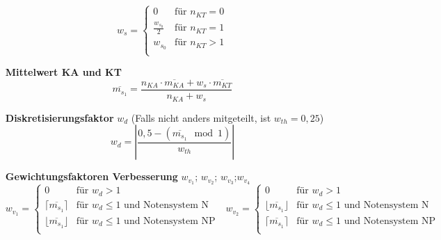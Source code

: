 \documentclass{article}
\begin{document}
\begin{enumerate}[label=\textbf{\textbullet}, align=left, leftmargin=*]
	\[
	w_s =
	\begin{cases}
		0 & \text{für }  n_{KT} = 0 \\
		\frac{w_{s_0}}{2} & \text{für }    n_{KT} = 1 \\
		w_{s_0} & \text{für }    n_{KT} > 1 \\
	\end{cases}
	\]	
	\item[\textbf{Mittelwert KA und KT}] 
	\[
	\overline{m_{s_1}} = \frac{ n_{KA} \cdot \overline{m_{KA}} + w_s \cdot \overline{m_{KT}} }{n_{KA} + w_s}
	\]
	\item[\textbf{Diskretisierungsfaktor}] $w_{d}$ (Falls nicht anders mitgeteilt, ist $w_{th}=0{,}25$) \cite{wikimodulo,wikibetrag}
	\[
	w_{d} = \left| \frac{0{,}5 - (\overline{m_{s_1}} \mod 1)}{w_{th}} \right|
	\]
	\item[\textbf{Gewichtungsfaktoren Verbesserung}] $w_{v_1}$; $w_{v_2}$; $w_{v_3}$;$w_{v_4}$ \cite{wikigaussklammer} \\
	\[
	w_{v_1} =
	\begin{cases}
		0 & \text{für }  w_{d} > 1 \\
		\lceil \overline{m_{s_1}} \rceil & \text{für }    w_{d} \leq 1 \text{ und Notensystem N} \\
		\lfloor \overline{m_{s_1}} \rfloor & \text{für }    w_{d} \leq 1 \text{ und Notensystem NP} \\
	\end{cases}
	\,\,\,\,
	w_{v_2} =
	\begin{cases}
		0 & \text{für }  w_{d} > 1 \\
		\lfloor \overline{m_{s_1}} \rfloor & \text{für }    w_{d} \leq 1 \text{ und Notensystem N} \\
		\lceil \overline{m_{s_1}} \rceil & \text{für }    w_{d} \leq 1 \text{ und Notensystem NP} \\
	\end{cases}
	\]
	

\end{enumerate}
\end{document}
